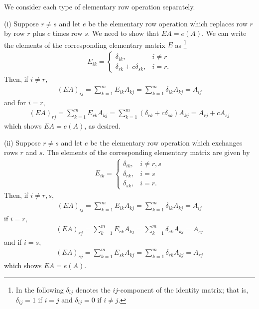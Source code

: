 \documentclass[12pt,letterpaper,reqno]{article}
\numberwithin{equation}{section}
\begin{document}
\begin{pf}
We consider each type of elementary row operation separately.

(i) Suppose $r \neq s$ and let $e$ be the elementary row operation which replaces row $r$ by row $r$ plus $c$ times row $s$. We need to show that $EA=e(A)$. We can write the elements of the corresponding elementary matrix $E$ as \footnote{In the following $\delta_{ij}$ denotes the $ij$-component of the identity matrix; that is, $\delta_{ij}=1$ if $i=j$ and $\delta_{ij}=0$ if $i \neq j$.}
	 \begin{align*}
	 	E_{ik}=\begin{cases}
	 		\delta_{ik}, &i \neq r \\
	 		\delta_{rk}+c\delta_{sk}, &i=r.
	 	\end{cases}
	 \end{align*}
Then, if $i \neq r$, 
\begin{align*}
	(EA)_{ij}=\sum_{k=1}^m E_{ik}A_{kj} = \sum_{k=1}^m\delta_{ik}A_{kj}=A_{ij}
\end{align*}
and for $i=r$,
\begin{align*}
	(EA)_{rj}=\sum_{k=1}^m E_{rk}A_{kj} =\sum_{k=1}^m(\delta_{rk}+c\delta_{sk})A_{kj} =A_{rj}+cA_{sj}
\end{align*}
which shows $EA=e(A)$, as desired.

(ii) Suppose $r \neq s$ and let $e$ be the elementary row operation which exchanges rows $r$ and $s$. The elements of the corresponding elementary matrix are given by
	 \begin{align*}
	 	E_{ik}=\begin{cases}
	 		\delta_{ik}, &i \neq r,s \\
	 		\delta_{rk}, &i=s \\
	 		\delta_{sk}, &i=r.
	 	\end{cases}
	 \end{align*}
Then, if $i \neq r,s$, 
\begin{align*}
	(EA)_{ij}=\sum_{k=1}^m E_{ik}A_{kj} = \sum_{k=1}^m\delta_{ik}A_{kj}=A_{ij}
\end{align*}
if $i=r$,
\begin{align*}
	(EA)_{rj}=\sum_{k=1}^m E_{rk}A_{kj} =\sum_{k=1}^m\delta_{sk}A_{kj} =A_{sj}
\end{align*}
and if $i=s$,
\begin{align*}
	(EA)_{sj}=\sum_{k=1}^m E_{sk}A_{kj} =\sum_{k=1}^m\delta_{rk}A_{kj} =A_{rj}
\end{align*}
which shows $EA=e(A)$.


\end{pf}
\end{document}
